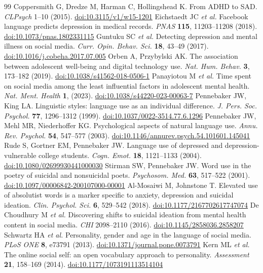 \documentclass[11pt]{article}
\newcommand{\doi}[1]{\href{https://doi.org/#1}{doi:#1}}
\begin{document}
\begin{thebibliography}{99}
 Coppersmith G, Dredze M, Harman C, Hollingshead K. From ADHD to SAD. \emph{CLPsych} 1--10 (2015). \doi{10.3115/v1/w15-1201}
 Eichstaedt JC \emph{et al.} Facebook language predicts depression in medical records. \emph{PNAS} \textbf{115}, 11203--11208 (2018). \doi{10.1073/pnas.1802331115}
 Guntuku SC \emph{et al.} Detecting depression and mental illness on social media. \emph{Curr. Opin. Behav. Sci.} \textbf{18}, 43--49 (2017). \doi{10.1016/j.cobeha.2017.07.005}
 Orben A, Przybylski AK. The association between adolescent well-being and digital technology use. \emph{Nat. Hum. Behav.} \textbf{3}, 173--182 (2019). \doi{10.1038/s41562-018-0506-1}
 Panayiotou M \emph{et al.} Time spent on social media among the least influential factors in adolescent mental health. \emph{Nat. Ment. Health} \textbf{1}, (2023). \doi{10.1038/s44220-023-00063-7}
 Pennebaker JW, King LA. Linguistic styles: language use as an individual difference. \emph{J. Pers. Soc. Psychol.} \textbf{77}, 1296--1312 (1999). \doi{10.1037/0022-3514.77.6.1296}
 Pennebaker JW, Mehl MR, Niederhoffer KG. Psychological aspects of natural language use. \emph{Annu. Rev. Psychol.} \textbf{54}, 547--577 (2003). \doi{10.1146/annurev.psych.54.101601.145041}
 Rude S, Gortner EM, Pennebaker JW. Language use of depressed and depression-vulnerable college students. \emph{Cogn. Emot.} \textbf{18}, 1121--1133 (2004). \doi{10.1080/02699930441000030}
 Stirman SW, Pennebaker JW. Word use in the poetry of suicidal and nonsuicidal poets. \emph{Psychosom. Med.} \textbf{63}, 517--522 (2001). \doi{10.1097/00006842-200107000-00001}
 Al-Mosaiwi M, Johnstone T. Elevated use of absolutist words is a marker specific to anxiety, depression and suicidal ideation. \emph{Clin. Psychol. Sci.} \textbf{6}, 529--542 (2018). \doi{10.1177/2167702617747074}
 De Choudhury M \emph{et al.} Discovering shifts to suicidal ideation from mental health content in social media. \emph{CHI} 2098--2110 (2016). \doi{10.1145/2858036.2858207}
 Schwartz HA \emph{et al.} Personality, gender and age in the language of social media. \emph{PLoS ONE} \textbf{8}, e73791 (2013). \doi{10.1371/journal.pone.0073791}
 Kern ML \emph{et al.} The online social self: an open vocabulary approach to personality. \emph{Assessment} \textbf{21}, 158--169 (2014). \doi{10.1177/1073191113514104}

\end{thebibliography}
\end{document}

